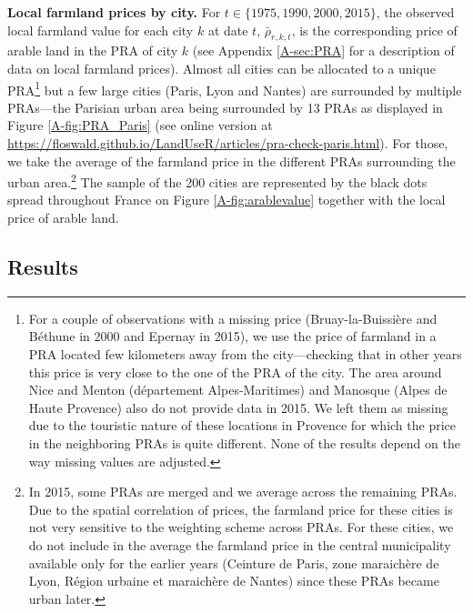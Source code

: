 \documentclass[11pt]{report}
\begin{document}
\noindent \textbf{Local farmland prices by city.} For $t \in \{1975, 1990, 2000, 2015\}$, the observed local farmland value for each city $k$ at date $t$, $\bar{\rho}_{r,k,t}$, is the corresponding price of arable land in the PRA of city $k$ (see Appendix \ref{A-sec:PRA} for a description of data on local farmland prices). Almost all cities can be allocated to a unique PRA\footnote{For a couple of observations with a missing price (Bruay-la-Buissière and Béthune in 2000 and Epernay in 2015), we use the price of farmland in a PRA located few kilometers away from the city---checking that in other years this price is very close to the one of the PRA of the city. The area around Nice and Menton (département Alpes-Maritimes) and Manosque (Alpes de Haute Provence) also do not provide data in 2015. We left them as missing due to the touristic nature of these locations in Provence for which the price in the neighboring PRAs is quite different. None of the results depend on the way missing values are adjusted.} but a few large cities (Paris, Lyon and Nantes) are surrounded by multiple PRAs---the Parisian urban area being surrounded by 13 PRAs as displayed in Figure \ref{A-fig:PRA_Paris} (see online version at \url{https://floswald.github.io/LandUseR/articles/pra-check-paris.html}). For those, we take the average of the farmland price in the different PRAs surrounding the urban area.\footnote{In 2015, some PRAs are merged and we average across the remaining PRAs. Due to the spatial correlation of prices, the farmland price for these cities is not very sensitive to the weighting scheme across PRAs. For these cities, we do not include in the average the farmland price in the central municipality available only for the earlier years (Ceinture de Paris, zone maraichère de Lyon, Région urbaine et maraichère de Nantes) since these PRAs became urban later.} The sample of the 200 cities are represented by the black dots spread throughout France on Figure \ref{A-fig:arablevalue} together with the local price of arable land.


\subsection{Results}
\end{document}
